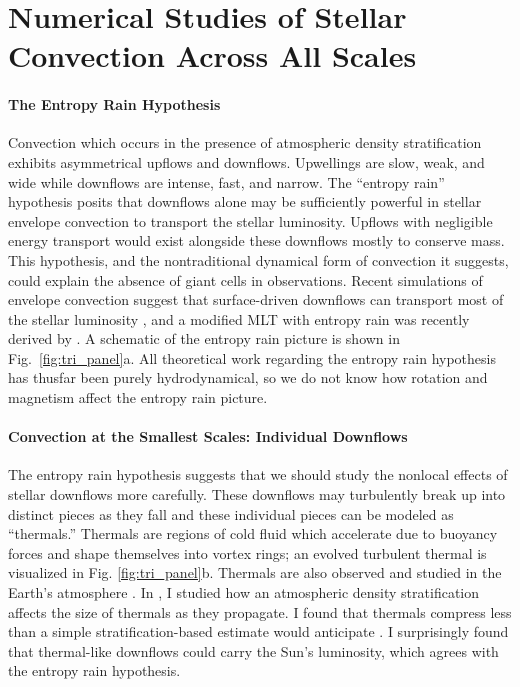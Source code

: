 \documentclass[preprint, hmargin=1in, vmargin=1in]{aastex62}
\begin{document}
\section*{\textbf{Numerical Studies of Stellar Convection Across All Scales}}
\paragraph{The Entropy Rain Hypothesis}
Convection which occurs in the presence of atmospheric density stratification exhibits asymmetrical upflows and downflows.
Upwellings are slow, weak, and wide while downflows are intense, fast, and narrow.
The ``entropy rain'' hypothesis \citep[][]{spruit1997} posits that downflows alone may be sufficiently powerful in stellar envelope convection to transport the stellar luminosity.
Upflows with negligible energy transport would exist alongside these downflows mostly to conserve mass.
This hypothesis, and the nontraditional dynamical form of convection it suggests, could explain the absence of giant cells in observations.
Recent simulations of envelope convection suggest that surface-driven downflows can transport most of the stellar luminosity \citep{kapyla&all2017}, and a modified MLT with entropy rain was recently derived by \citet{brandenburg2016}.
A schematic of the entropy rain picture is shown in Fig.~\ref{fig:tri_panel}a.
All theoretical work regarding the entropy rain hypothesis has thusfar been purely hydrodynamical, so we do not know how rotation and magnetism affect the entropy rain picture.


\paragraph{Convection at the Smallest Scales: Individual Downflows} 
The entropy rain hypothesis suggests that we should study the nonlocal effects of stellar downflows more carefully.
These downflows may turbulently break up into distinct pieces as they fall and these individual pieces can be modeled as ``thermals.''
Thermals are regions of cold fluid which accelerate due to buoyancy forces and shape themselves into vortex rings; an evolved turbulent thermal is visualized in Fig. \ref{fig:tri_panel}b.
Thermals are also observed and studied in the Earth's atmosphere \citep{lecoanet&jeevanjee2019}.
In \citet{andersLB2019}, I studied how an atmospheric density stratification affects the size of thermals as they propagate.
I found that thermals compress less than a simple stratification-based estimate would anticipate \citep{brandenburg2016}.
I surprisingly found that thermal-like downflows could carry the Sun's luminosity, which agrees with the entropy rain hypothesis.
\end{document}
